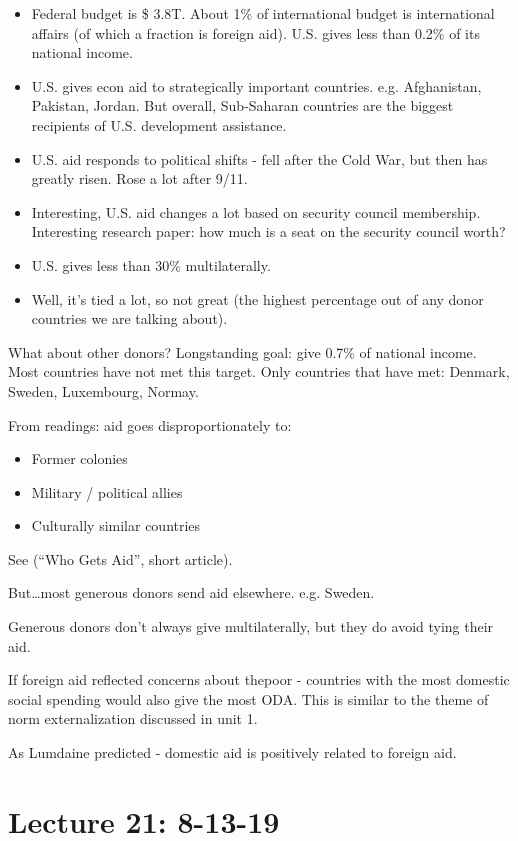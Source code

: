 \documentclass{article}
\begin{document}
\begin{itemize}
  \item Federal budget is \$ 3.8T.  About 1\% of international budget is international affairs (of which a fraction is foreign aid). U.S. gives less than 0.2\% of its national income.
  \item U.S. gives econ aid to strategically important countries.  e.g. Afghanistan, Pakistan, Jordan.  But overall, Sub-Saharan countries are the biggest recipients of U.S. development assistance.
  \item U.S. aid responds to political shifts - fell after the Cold War, but then has greatly risen.  Rose a lot after 9/11.
  \item Interesting, U.S. aid changes a lot based on security council membership.  Interesting research paper: how much is a seat on the security council worth?
  \item U.S. gives less than 30\% multilaterally.
  \item Well, it's tied a lot, so not great (the highest percentage out of any donor countries we are talking about).
\end{itemize}

What about other donors?  Longstanding goal: give 0.7\% of national income.  Most countries have not met this target.  Only countries that have met: Denmark, Sweden, Luxembourg, Normay.

From readings: aid goes disproportionately to:
\begin{itemize}
  \item Former colonies
  \item Military / political allies
  \item Culturally similar countries
\end{itemize}
See (``Who Gets Aid'', short article).

But\ldots most generous donors send aid elsewhere.  e.g. Sweden.

Generous donors don't always give multilaterally, but they do avoid tying their aid.

If foreign aid reflected concerns about thepoor - countries with the most domestic social spending would also give the most ODA.  This is similar to the theme of norm externalization discussed in unit 1.

As Lumdaine predicted - domestic aid is positively related to foreign aid.

\section{Lecture 21: 8-13-19}
\end{document}
